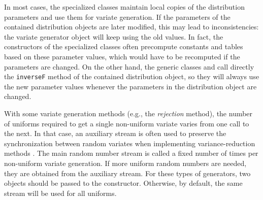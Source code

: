 In most cases, the specialized classes maintain local copies of the
distribution parameters and use them for variate generation.
If the parameters of the contained distribution objects are later modified,
this may lead to inconsistencies: the variate generator object will
keep using the old values.
In fact, the constructors of the specialized classes often precompute
constants and tables based on these parameter values, which would have
to be recomputed if the parameters are changed.
On the other hand, the generic classes
 and
call directly the \texttt{inverseF} method of the contained
distribution object, so they will always use the new parameter values
whenever the parameters in the distribution object are changed.
%
%


With some variate generation methods (e.g., the \emph{rejection}
method), the number of uniforms required to get a single non-uniform
variate varies from one call to the next.
In that case, an auxiliary stream is often used to preserve
the synchronization between random variates when implementing
variance-reduction methods \cite{sLAW00a}.
The main random number stream is called a fixed number of times
per non-uniform variate generation.  If more uniform random numbers
are needed, they are obtained from the auxiliary stream.
For these types of generators, two
 objects
should be passed to the constructor.
Otherwise, by default, the same stream will be used for all uniforms.


